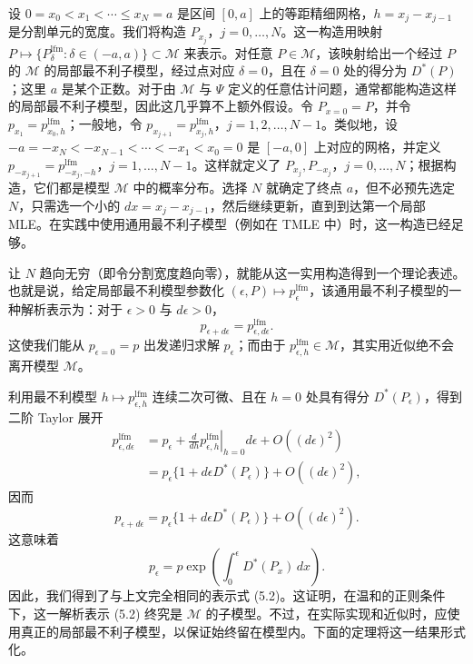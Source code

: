 设 $0=x_0<x_1<\cdots\leq x_N=a$ 是区间 $[0,a]$ 上的等距精细网格，$h=x_j-x_{j-1}$ 是分割单元的宽度。我们将构造 $P_{x_j}$，$j=0,\ldots,N$。这一构造用映射
$P\mapsto\{P_\delta^{\mathrm{lfm}}:\delta\in(-a,a)\}\subset\mathcal M$
来表示。对任意 $P\in\mathcal M$，该映射给出一个经过 $P$ 的 $\mathcal M$ 的局部最不利子模型，经过点对应 $\delta=0$，且在 $\delta=0$ 处的得分为 $D^*(P)$；这里 $a$ 是某个正数。对于由 $\mathcal M$ 与 $\Psi$ 定义的任意估计问题，通常都能构造这样的局部最不利子模型，因此这几乎算不上额外假设。令 $P_{x=0}=P$，并令 $p_{x_1}=p_{x_0,h}^{\mathrm{lfm}}$；一般地，令 $p_{x_{j+1}}=p_{x_j,h}^{\mathrm{lfm}}$，$j=1,2,\ldots,N-1$。类似地，设 $-a=-x_N<-x_{N-1}<\cdots<-x_1<x_0=0$ 是 $[-a,0]$ 上对应的网格，并定义 $p_{-x_{j+1}}=p_{-x_j,-h}^{\mathrm{lfm}}$，$j=1,\ldots,N-1$。这样就定义了 $P_{x_j},P_{-x_j}$，$j=0,\ldots,N$；根据构造，它们都是模型 $\mathcal M$ 中的概率分布。选择 $N$ 就确定了终点 $a$，但不必预先选定 $N$，只需选一个小的 $dx=x_j-x_{j-1}$，然后继续更新，直到到达第一个局部 MLE。在实践中使用通用最不利子模型（例如在 TMLE 中）时，这一构造已经足够。

让 $N$ 趋向无穷（即令分割宽度趋向零），就能从这一实用构造得到一个理论表述。也就是说，给定局部最不利模型参数化 $(\epsilon,P)\mapsto p_\epsilon^{\mathrm{lfm}}$，该通用最不利子模型的一种解析表示为：对于 $\epsilon>0$ 与 $d\epsilon>0$，
\[
 p_{\epsilon+d\epsilon}=p_{\epsilon,d\epsilon}^{\mathrm{lfm}}.
\]
这使我们能从 $p_{\epsilon=0}=p$ 出发递归求解 $p_\epsilon$；而由于 $p_{\epsilon,h}^{\mathrm{lfm}}\in\mathcal M$，其实用近似绝不会离开模型 $\mathcal M$。

利用最不利模型 $h\mapsto p_{\epsilon,h}^{\mathrm{lfm}}$ 连续二次可微、且在 $h=0$ 处具有得分 $D^*(P_\epsilon)$，得到二阶 Taylor 展开
\[
 \begin{aligned}
 p_{\epsilon,d\epsilon}^{\mathrm{lfm}}
 &=p_\epsilon+
 \left.\frac{d}{dh}p_{\epsilon,h}^{\mathrm{lfm}}\right|_{h=0}
 d\epsilon+O((d\epsilon)^2)\\
 &=p_\epsilon\{1+d\epsilon D^*(P_\epsilon)\}
 +O((d\epsilon)^2),
 \end{aligned}
\]
因而
\[
 p_{\epsilon+d\epsilon}
 =p_\epsilon\{1+d\epsilon D^*(P_\epsilon)\}+O((d\epsilon)^2).
\]
这意味着
\[
 p_\epsilon=p\exp\left(\int_0^\epsilon D^*(P_x)\,dx\right).
\]
因此，我们得到了与上文完全相同的表示式 (5.2)。这证明，在温和的正则条件下，这一解析表示 (5.2) 终究是 $\mathcal M$ 的子模型。不过，在实际实现和近似时，应使用真正的局部最不利子模型，以保证始终留在模型内。下面的定理将这一结果形式化。

